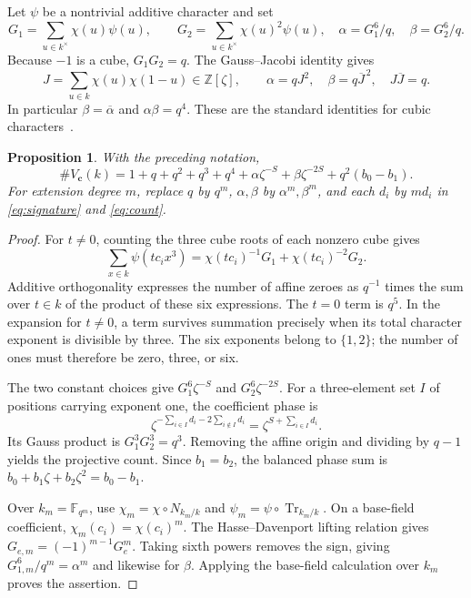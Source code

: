 \documentclass[11pt]{article}
\newtheorem{proposition}[theorem]{Proposition}
\theoremstyle{remark}\newtheorem{remark}[theorem]{Remark}
\newcommand{\F}{\mathbb F}\newcommand{\PP}{\mathbb P}\newcommand{\Z}{\mathbb Z}
\begin{document}
Let $\psi$ be a nontrivial additive character and set
\[
G_1=\sum_{u\in k^\times}\chi(u)\psi(u),\qquad
G_2=\sum_{u\in k^\times}\chi(u)^2\psi(u),\quad
\alpha=G_1^6/q,\quad\beta=G_2^6/q.
\]
Because $-1$ is a cube, $G_1G_2=q$. The Gauss--Jacobi identity gives
\[
J=\sum_{u\in k}\chi(u)\chi(1-u)\in\Z[\zeta],\qquad
\alpha=qJ^2,\quad \beta=q\overline J^{\,2},\quad J\overline J=q.
\]
In particular $\beta=\overline\alpha$ and $\alpha\beta=q^4$. These are the standard identities for cubic characters~\cite{weil,gy}.

\begin{proposition}\label{prop:points}
With the preceding notation,
\begin{equation}\label{eq:count}
\#V_{\boldsymbol c}(k)=1+q+q^2+q^3+q^4+
\alpha\zeta^{-S}+\beta\zeta^{-2S}+q^2(b_0-b_1).
\end{equation}
For extension degree $m$, replace $q$ by $q^m$, $\alpha,\beta$ by $\alpha^m,\beta^m$, and each $d_i$ by $m d_i$ in \eqref{eq:signature} and \eqref{eq:count}.
\end{proposition}
\begin{proof}
For $t\ne0$, counting the three cube roots of each nonzero cube gives
\[
\sum_{x\in k}\psi(t c_i x^3)=\chi(tc_i)^{-1}G_1+\chi(tc_i)^{-2}G_2.
\]
Additive orthogonality expresses the number of affine zeroes as $q^{-1}$ times the sum over $t\in k$ of the product of these six expressions. The $t=0$ term is $q^5$. In the expansion for $t\ne0$, a term survives summation precisely when its total character exponent is divisible by three. The six exponents belong to $\{1,2\}$; the number of ones must therefore be zero, three, or six.

The two constant choices give $G_1^6\zeta^{-S}$ and $G_2^6\zeta^{-2S}$. For a three-element set $I$ of positions carrying exponent one, the coefficient phase is
\[
\zeta^{-\sum_{i\in I}d_i-2\sum_{i\notin I}d_i}
=\zeta^{S+\sum_{i\in I}d_i}.
\]
Its Gauss product is $G_1^3G_2^3=q^3$. Removing the affine origin and dividing by $q-1$ yields the projective count. Since $b_1=b_2$, the balanced phase sum is $b_0+b_1\zeta+b_2\zeta^2=b_0-b_1$.

Over $k_m=\F_{q^m}$, use $\chi_m=\chi\circ N_{k_m/k}$ and $\psi_m=\psi\circ\operatorname{Tr}_{k_m/k}$. On a base-field coefficient, $\chi_m(c_i)=\chi(c_i)^m$. The Hasse--Davenport lifting relation gives $G_{e,m}=(-1)^{m-1}G_e^m$. Taking sixth powers removes the sign, giving $G_{1,m}^6/q^m=\alpha^m$ and likewise for $\beta$. Applying the base-field calculation over $k_m$ proves the assertion.
\end{proof}
\end{document}
